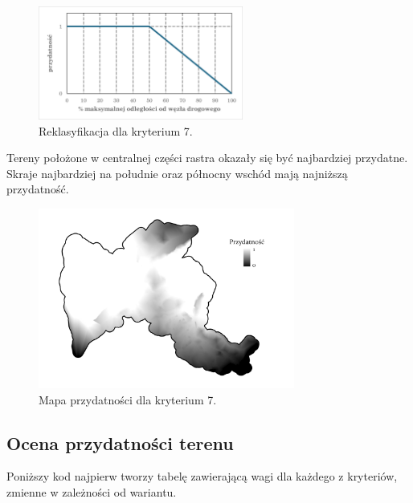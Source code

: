 \documentclass{article}
\begin{document}
\vspace{5pt}

\begin{figure}[H]
    \centering
    \includegraphics[width=0.6\textwidth]{img/kryterium7-wykres-glowny.png}
    \caption{Reklasyfikacja dla kryterium 7.}
\end{figure}
\vspace{10pt}

Tereny położone w centralnej części rastra okazały się być najbardziej przydatne. Skraje najbardziej na południe oraz północny wschód mają najniższą przydatność.
\vspace{5pt}

\begin{figure}[H]
    \centering
    \includegraphics[width=0.75\textwidth]{img/kryterium7-layout.jpg}
    \caption{Mapa przydatności dla kryterium 7.}
\end{figure}
\vspace{10pt}

\newpage
\subsection{Ocena przydatności terenu}
Poniższy kod najpierw tworzy tabelę zawierającą wagi dla każdego z kryteriów, zmienne w zależności od wariantu. 
\vspace{5pt}
\end{document}
